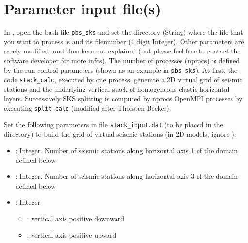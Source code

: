 \section{Parameter input file(s)}
In \skstitle{}, open the bash file \texttt{pbs\_sks} and set the directory  (String) where the \cijkltitle{} file that you want to process is and its filenumber  (4 digit Integer). Other parameters are rarely modified, and thus here not explained (but please feel free to contact the software developer for more infos). The number of processes (nprocs) is defined by the run control parameters (shown as an example in \texttt{pbs\_sks}). 
At first, the code \texttt{stack\_calc}, executed by one process, generate a 2D virtual grid of seismic stations and the underlying vertical stack of homogeneous elastic horizontal layers. Successively SKS splitting is computed by nprocs OpenMPI processes by executing \texttt{split\_calc} (modified after Thorsten Becker).

Set the following parameters in file \texttt{stack\_input.dat} (to be placed in the  directory) to build the grid of virtual seismic stations (in 2D models, ignore ):

\begin{itemize}
    \item {}: Integer. Number of seismic stations along horizontal axis 1 of the domain defined below
    \item {}: Integer. Number of seismic stations along horizontal axis 3 of the domain defined below
    \item {}: Integer
    \begin{itemize}
	    \item[] : vertical axis positive downward
        \item[] : vertical axis positive upward
    \end{itemize}
\end{itemize}
    
